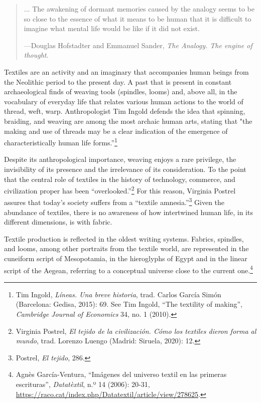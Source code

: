 \documentclass{tufte-handout}
\begin{document}
\begin{quote}
... The awakening of dormant memories caused by the analogy seems to be
so close to the essence of what it means to be human that it is
difficult to imagine what mental life would be like if it did not exist.

---Douglas Hofstadter and Emmanuel Sander, \emph{The Analogy. The engine
of thought}.
\end{quote}

Textiles are an activity and an imaginary that accompanies human beings
from the Neolithic period to the present day. A past that is present in
constant archaeological finds of weaving tools (spindles, looms) and,
above all, in the vocabulary of everyday life that relates various human
actions to the world of thread, weft, warp. Anthropologist Tim Ingold
defends the idea that spinning, braiding, and weaving are among the most
archaic human arts, stating that "the making and use of threads may be a
clear indication of the emergence of characteristically human life
forms.''\footnote{Tim Ingold, \emph{Líneas. Una breve historia}, trad.
  Carlos García Simón (Barcelona: Gedisa, 2015): 69. See Tim Ingold,
  ``The textility of making'', \emph{Cambridge Journal of Economics} 34,
  no. 1 (2010).}

Despite its anthropological importance, weaving enjoys a rare privilege,
the invisibility of its presence and the irrelevance of its
consideration. To the point that the central role of textiles in the
history of technology, commerce, and civilization proper has been
``overlooked.''\footnote{Virginia Postrel, \emph{El tejido de la
  civilización. Cómo los textiles dieron forma al mundo}, trad. Lorenzo
  Luengo (Madrid: Siruela, 2020): 12.} For this reason, Virginia Postrel
assures that today's society suffers from a ``textile
amnesia.''\footnote{Postrel, \emph{El tejido}, 286.} Given the abundance
of textiles, there is no awareness of how intertwined human life, in its
different dimensions, is with fabric.

Textile production is reflected in the oldest writing systems. Fabrics,
spindles, and looms, among other portraits from the textile world, are
represented in the cuneiform script of Mesopotamia, in the hieroglyphs
of Egypt and in the linear script of the Aegean, referring to a
conceptual universe close to the current one.\footnote{Agnès
  García-Ventura, ``Imágenes del universo textil en las primeras
  escrituras'', \emph{Datatèxtil}, n.º 14 (2006): 20-31,
  \url{https://raco.cat/index.php/Datatextil/article/view/278625}.}
\end{document}
